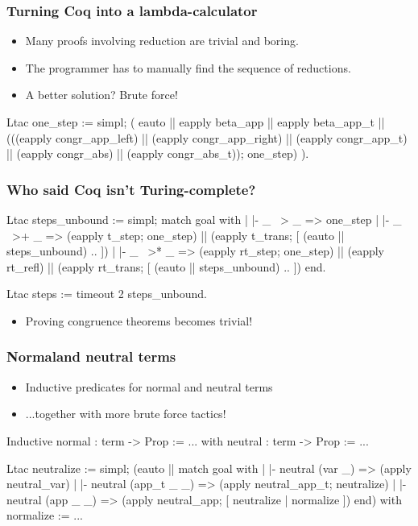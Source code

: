 \documentclass{beamer}
\begin{document}
\begin{frame}[fragile]
\frametitle{Turning Coq into a lambda-calculator}
\begin{itemize}
  \item Many proofs involving reduction are trivial and boring.
  \item The programmer has to manually find the sequence of reductions.
  \item A better solution? Brute force!
\end{itemize}

\begin{pyglist}[fontsize=\scriptsize]
Ltac one_step :=
  simpl; (
    eauto
      || eapply beta_app
      || eapply beta_app_t
      || (((eapply congr_app_left)
             || (eapply congr_app_right)
             || (eapply congr_app_t)
             || (eapply congr_abs)
             || (eapply congr_abs_t)); one_step)
  ).
\end{pyglist}
\end{frame}

\begin{frame}[fragile]
\frametitle{Who said Coq isn't Turing-complete?}
\begin{pyglist}[fontsize=\scriptsize]
Ltac steps_unbound :=
  simpl;
  match goal with
    | |- _ ~> _ => one_step
    | |- _ ~>+ _ =>
      (eapply t_step; one_step) 
      || (eapply t_trans; [ (eauto || steps_unbound) .. ])
    | |- _ ~>* _ =>
      (eapply rt_step; one_step) || (eapply rt_refl) 
      || (eapply rt_trans; [ (eauto || steps_unbound) .. ])
  end.

Ltac steps := timeout 2 steps_unbound.
\end{pyglist}
\begin{itemize}
  \item Proving congruence theorems becomes trivial!
\end{itemize}
\end{frame}

\begin{frame}[fragile]
\frametitle{Normaland neutral terms}
\begin{itemize}
  \item Inductive predicates for normal and neutral terms
  \item ...together with more brute force tactics!
\end{itemize}

\begin{pyglist}[fontsize=\scriptsize]
Inductive normal : term -> Prop :=
...
with neutral : term -> Prop :=
...

Ltac neutralize :=
  simpl;
  (eauto
     || match goal with
          | |- neutral (var _) => 
          (apply neutral_var)
          | |- neutral (app_t _ _) => 
          (apply neutral_app_t; neutralize)
          | |- neutral (app _ _) => 
          (apply neutral_app; [ neutralize | normalize ])
        end)
  with normalize := ...
\end{pyglist}
\end{frame}
\end{document}
